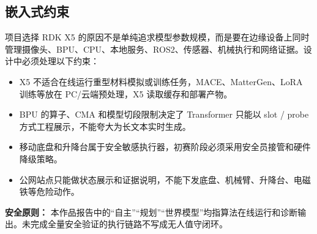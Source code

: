 \subsection{嵌入式约束}
项目选择 RDK X5 的原因不是单纯追求模型参数规模，而是要在边缘设备上同时管理摄像头、BPU、CPU、本地服务、ROS2、传感器、机械执行和网络证据。设计中必须处理以下约束：
\begin{itemize}
  \item X5 不适合在线运行重型材料模拟或训练任务，MACE、MatterGen、LoRA 训练等放在 PC/云端预处理，X5 读取缓存和部署产物。
  \item BPU 的算子、CMA 和模型切段限制决定了 Transformer 只能以 slot / probe 方式工程展示，不能夸大为长文本实时生成。
  \item 移动底盘和升降台属于安全敏感执行器，初赛阶段必须采用安全员接管和硬件降级策略。
  \item 公网站点只能做状态展示和证据说明，不能下发底盘、机械臂、升降台、电磁铁等危险动作。
\end{itemize}

\begin{warnbox}
\textbf{安全原则：} 本作品报告中的“自主”“规划”“世界模型”均指算法在线运行和诊断输出。未完成全量安全验证的执行链路不写成无人值守闭环。
\end{warnbox}
